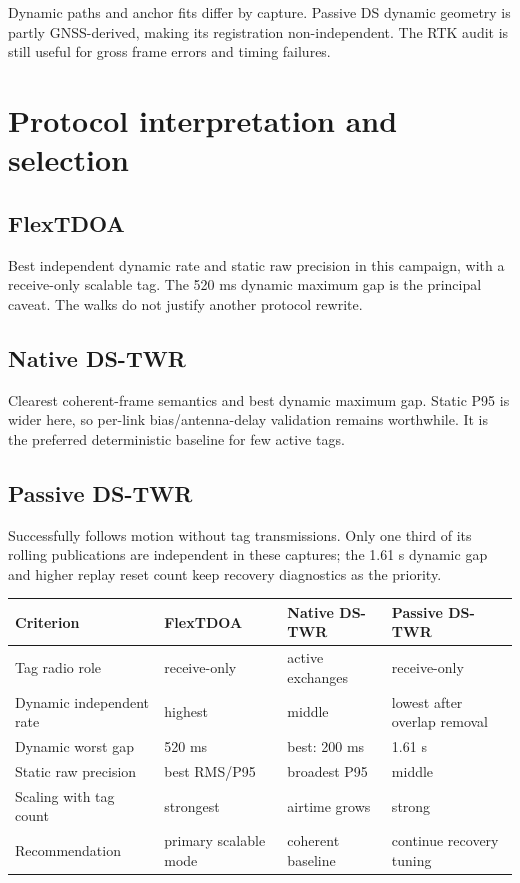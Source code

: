 \documentclass[10pt,a4paper]{article}
\begin{document}
Dynamic paths and anchor fits differ by capture. Passive DS dynamic geometry is
partly GNSS-derived, making its registration non-independent. The RTK audit is
still useful for gross frame errors and timing failures.

\section{Protocol interpretation and selection}
\subsection{FlexTDOA}
Best independent dynamic rate and static raw precision in this campaign, with
a receive-only scalable tag. The 520 ms dynamic maximum gap is the principal
caveat. The walks do not justify another protocol rewrite.

\subsection{Native DS-TWR}
Clearest coherent-frame semantics and best dynamic maximum gap. Static P95 is
wider here, so per-link bias/antenna-delay validation remains worthwhile. It is
the preferred deterministic baseline for few active tags.

\subsection{Passive DS-TWR}
Successfully follows motion without tag transmissions. Only one third of its
rolling publications are independent in these captures; the 1.61 s dynamic gap
and higher replay reset count keep recovery diagnostics as the priority.

\begin{center}\small
\begin{tabular}{p{}p{}p{}p{}}
\toprule
Criterion & FlexTDOA & Native DS-TWR & Passive DS-TWR\\
\midrule
Tag radio role & receive-only & active exchanges & receive-only\\
Dynamic independent rate & highest & middle & lowest after overlap removal\\
Dynamic worst gap & 520 ms & best: 200 ms & 1.61 s\\
Static raw precision & best RMS/P95 & broadest P95 & middle\\
Scaling with tag count & strongest & airtime grows & strong\\
Recommendation & primary scalable mode & coherent baseline & continue recovery tuning\\
\bottomrule
\end{tabular}
\end{center}
\end{document}
